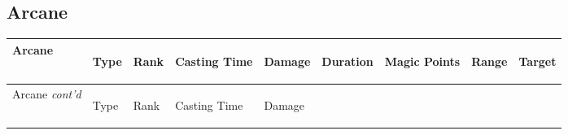 \documentclass[twoside]{book}
\begin{document}
    

\subsection{Arcane}
    
\begin{longtable}{p{1.25in}lp{2em}p{3em}llp{7em}ll} 
  Arcane
  &
  \begin{turn}{70}{Type}\end{turn}
          
  &
  \begin{turn}{70}{Rank}\end{turn}
          
  &
  \begin{turn}{70}{Casting Time}\end{turn}
          
  &
  \begin{turn}{70}{Damage}\end{turn}
          
  &
  \begin{turn}{70}{Duration}\end{turn}
          
  &
  \begin{turn}{70}{Magic Points}\end{turn}
          
  &
  \begin{turn}{70}{Range}\end{turn}
          
  &
  \begin{turn}{70}{Target}\end{turn}
          
  \\
  \hline
  \hline
  \endfirsthead
  Arcane \textit{cont'd}
        
  &
  \begin{turn}{70}{Type}\end{turn}
          
  &
  \begin{turn}{70}{Rank}\end{turn}
          
  &
  \begin{turn}{70}{Casting Time}\end{turn}
          
  &
  \begin{turn}{70}{Damage}\end{turn}
          

\end{longtable}
\end{document}
